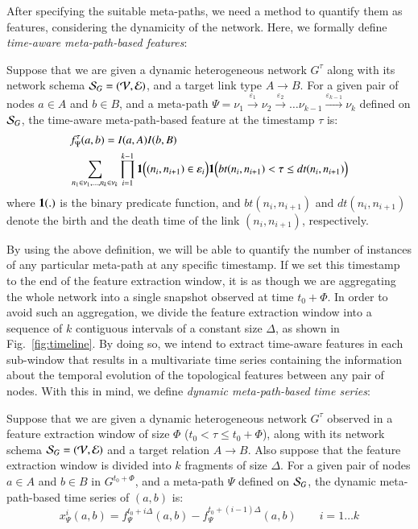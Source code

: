 After specifying the suitable meta-paths, we need a method to quantify them as features, considering the dynamicity of the network. Here, we formally define \emph{time-aware meta-path-based features}:

\begin{definition}
	Suppose that we are given a dynamic heterogeneous network $G^{\tau}$ along with its network schema $\mathcal{S}_G=(\mathcal{V}, \mathcal{E})$, and a target link type $A\rightarrow B$. For a given pair of nodes $a\in A$ and $b\in B$, and a meta-path $\Psi=\nu_1\xrightarrow{\varepsilon_1}\nu_2\xrightarrow{\varepsilon_2}\dots\nu_{k-1}\xrightarrow{\varepsilon_{k-1}}\nu_k$ defined on $\mathcal{S}_G$, the time-aware meta-path-based feature at the timestamp $\tau$ is:
	\begin{equation*}
		\begin{split}
			&f_{\Psi}^\tau(a,b)=I(a,A)I(b,B)\\
			&\sum_{n_1\in\nu_1,\dots,n_k\in\nu_k}\prod_{i=1}^{k-1}\mathbf{1}\Big((n_i,n_{i+1})\in\varepsilon_i\Big)\mathbf{1}\Big(bt(n_i,n_{i+1}) < \tau \le dt(n_i,n_{i+1})\Big)
		\end{split}
	\end{equation*}
	where $\mathbf{1}(.)$ is the binary predicate function, and $bt(n_i,n_{i+1})$ and $dt(n_i,n_{i+1})$ denote the birth and the death time of the link $(n_i,n_{i+1})$, respectively.
\end{definition}

By using the above definition, we will be able to quantify the number of instances of any particular meta-path at any specific timestamp. If we set this timestamp to the end of the feature extraction window, it is as though we are aggregating the whole network into a single snapshot observed at time $t_0+\Phi$. In order to avoid such an aggregation, we divide the feature extraction window into a sequence of $k$ contiguous intervals of a constant size $\Delta$, as shown in Fig.~\ref{fig:timeline}. By doing so, we intend to extract time-aware features in each sub-window that results in a multivariate time series containing the information about the temporal evolution of the topological features between any pair of nodes. With this in mind, we define \emph{dynamic meta-path-based time series}:

\begin{definition}
	Suppose that we are given a dynamic heterogeneous network $G^{\tau}$ observed in a feature extraction window of size $\Phi$ ($t_0<\tau \le t_0+\Phi$), along with its network schema $\mathcal{S}_G=(\mathcal{V}, \mathcal{E})$ and a target relation $A\rightarrow B$. Also suppose that the feature extraction window is divided into $k$ fragments of size $\Delta$. For a given pair of nodes $a\in A$ and $b\in B$ in $G^{t_0+\Phi}$, and a meta-path $\Psi$ defined on $\mathcal{S}_G$, the dynamic meta-path-based time series of $(a,b)$ is:
	\begin{equation*}
		x_{\Psi}^i(a,b)=f_{\Psi}^{t_0+i\Delta}(a,b) - f_{\Psi}^{t_0+(i-1)\Delta}(a,b)\quad\quad i=1\dots k
	\end{equation*}
\end{definition}

